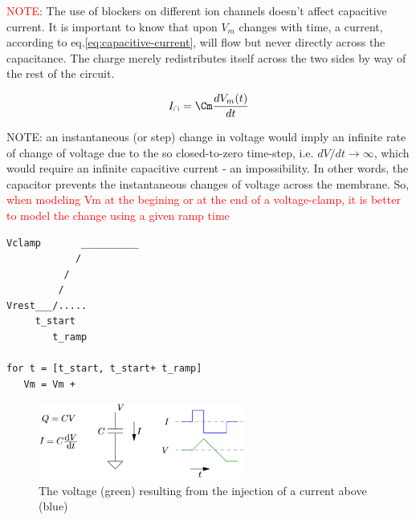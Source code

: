 \textcolor{red}{NOTE}: The use of blockers on different ion channels doesn't
affect capacitive current.
It is important to know that upon $V_m$ changes with time, a current, according
to eq.\ref{eq:capacitive-current}, will flow but never directly across the
capacitance. The charge merely redistributes itself across the two sides by way
of the rest of the circuit.

\begin{equation}
\label{eq:capacitive-current}
I_\cap = \Cm \frac{dV_m(t)}{dt}
\end{equation}


NOTE: an instantaneous (or step) change in voltage would imply an infinite rate
of change of voltage due to the so closed-to-zero time-step, i.e.
$dV/dt\rightarrow \infty$, which would require an infinite capacitive current -
an impossibility. In other words, the capacitor prevents the instantaneous
changes of voltage across the membrane. So, \textcolor{red}{when modeling Vm at
the begining or at the end of a voltage-clamp, it is better to model the change
using a given ramp time}

\begin{verbatim}
Vclamp       __________
            /
          /
         /
Vrest___/.....
     t_start
        t_ramp

for t = [t_start, t_start+ t_ramp]
   Vm = Vm +
\end{verbatim}


\begin{figure}[hbtp]
  \centerline{\includegraphics[height=2.5cm,
    angle=0]{./images/current-injection-through-capacitor.eps}}
\caption{The voltage (green) resulting from the injection of a current above
(blue)}
\label{fig:current-injection-through-capacitor}
\end{figure}


